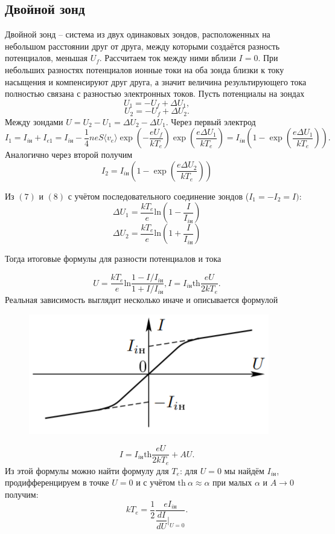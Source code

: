 \documentclass[a4paper,12pt]{article}
\begin{document}
\subsection*{Двойной зонд}
Двойной зонд -- система из двух одинаковых зондов, расположенных на небольшом расстоянии друг от друга, между которыми создаётся разность потенциалов, меньшая $U_f$. Рассчитаем ток между ними вблизи $I=0$. При небольших разностях потенциалов ионные токи на оба зонда близки к току насыщения и компенсируют друг друга, а значит величина результирующего тока полностью связана с разностью электронных токов. Пусть потенциалы на зондах
$$
U_1 = -U_f + \Delta U_1,
$$
$$
U_2 = -U_f + \Delta U_2.
$$
Между зондами $U = U_2 - U_1 = \Delta U_2 - \Delta U_1$.
Через первый электрод
\begin{equation}
I_1 = I_{i\text{н}} + I_{e1} = I_{i\text{н}} - \dfrac{1}{4}neS\langle v_e\rangle \exp\left(-\dfrac{eU_f}{kT_e}\right)\exp\left(\dfrac{e\Delta U_1}{kT_e}\right)=I_{i\text{н}}\left(1 - \exp\left( \dfrac{e\Delta U_1}{kT_e} \right)\right).
\end{equation}
Аналогично через второй получим
\begin{equation}
I_2 = I_{i\text{н}}\left(1 - \exp\left( \dfrac{e\Delta U_2}{kT_e} \right)\right)
\end{equation}
  
Из $(7)$ и $(8)$ с учётом последовательного соединение зондов ($I_1 = -I_2 = I)$:
$$
\Delta U_1= \dfrac{kT_e}{e}\text{ln}\left(1 - \dfrac{I}{I_{i\text{н}}}\right)
$$
$$
\Delta U_2= \dfrac{kT_e}{e}\text{ln}\left(1 + \dfrac{I}{I_{i\text{н}}}\right)
$$

Тогда итоговые формулы для разности потенциалов и тока

\begin{equation}
U = \dfrac{kT_e}{e}\text{ln}\dfrac{1 - I/I_{i\text{н}}}{1 + I/I_{i\text{н}}}, 
I = I_{i\text{н}} \text{th}\dfrac{eU}{2kT_e}.
\end{equation}
Реальная зависимость выглядит несколько иначе и описывается формулой 
\begin{figure}
\includegraphics[scale=0.8]{4.png}
\vspace{+30pt}
\end{figure}
\begin{equation}
I = I_{i\text{н}} \text{th}\dfrac{eU}{2kT_e} + AU.
\end{equation}
Из этой формулы можно найти формулу для $T_e$: для $U=0$ мы найдём $I_{i\text{н}}$, продифференцируем в точке $U=0$ и с учётом $\text{th}~\alpha \approx \alpha$ при малых $\alpha$ и $A\rightarrow 0$ получим:
\begin{equation}
kT_e = \dfrac{1}{2}\dfrac{eI_{i\text{н}}}{\dfrac{dI}{dU}|_{U=0}}.
\end{equation}
\end{document}
